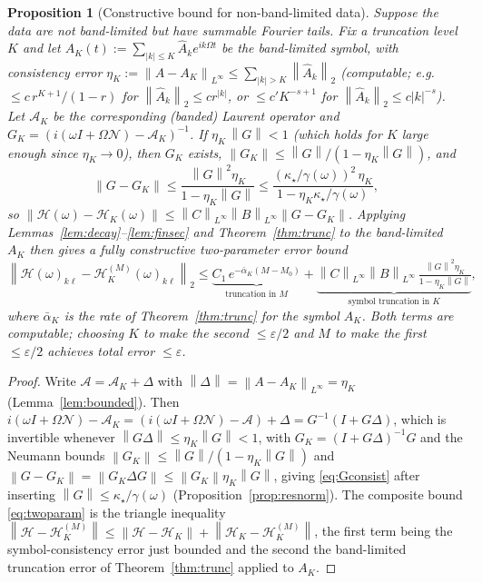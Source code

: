 \documentclass{amsart}
\newtheorem{proposition}{Proposition}
\theoremstyle{definition}
\newcommand{\norm}[1]{\left\lVert#1\right\rVert}
\newcommand{\Acal}{\mathcal{A}}
\newcommand{\Hcal}{\mathcal{H}}
\newcommand{\Ncal}{\mathcal{N}}
\begin{document}
\begin{proposition}[Constructive bound for non-band-limited data]\label{prop:general}
Suppose the data are not band-limited but have summable Fourier tails. Fix a
truncation level $K$ and let $A_K(t):=\sum_{|k|\le K}\hat A_k e^{ik\Omega t}$ be
the band-limited symbol, with consistency error
$\eta_K:=\norm{A-A_K}_{L^\infty}\le\sum_{|k|>K}\norm{\hat A_k}_2$
(computable; e.g. $\le c\,r^{K+1}/(1-r)$ for $\norm{\hat A_k}_2\le c r^{|k|}$, or
$\le c'K^{-s+1}$ for $\norm{\hat A_k}_2\le c|k|^{-s}$). Let $\Acal_K$ be the
corresponding (banded) Laurent operator and $G_K=(i(\omega I+\Omega\Ncal)-\Acal_K)^{-1}$.
If $\eta_K\,\norm{G}<1$ (which holds for $K$ large enough since
$\eta_K\to0$), then $G_K$ exists, $\norm{G_K}\le\norm{G}/(1-\eta_K\norm{G})$,
and
\begin{equation}\label{eq:Gconsist}
\norm{G-G_K}\le \frac{\norm{G}^2\eta_K}{1-\eta_K\norm{G}}
\le \frac{(\kappa_\star/\gamma(\omega))^2\,\eta_K}{1-\eta_K\kappa_\star/\gamma(\omega)},
\end{equation}
so $\norm{\Hcal(\omega)-\Hcal_K(\omega)}\le\norm{C}_{L^\infty}\norm{B}_{L^\infty}
\norm{G-G_K}$. Applying Lemmas~\ref{lem:decay}--\ref{lem:finsec} and
Theorem~\ref{thm:trunc} to the band-limited $A_K$ then gives a fully
\emph{constructive} two-parameter error bound
\begin{equation}\label{eq:twoparam}
\norm{\Hcal(\omega)_{k\ell}-\Hcal_K^{(M)}(\omega)_{k\ell}}_2
\le \underbrace{C_1\,e^{-\bar\alpha_K(M-M_0)}}_{\text{truncation in }M}
+\underbrace{\norm{C}_{L^\infty}\norm{B}_{L^\infty}\,\tfrac{\norm{G}^2\eta_K}{1-\eta_K\norm{G}}}_{\text{symbol truncation in }K},
\end{equation}
where $\bar\alpha_K$ is the rate of Theorem~\ref{thm:trunc} for the symbol $A_K$.
Both terms are computable; choosing $K$ to make the second $\le\varepsilon/2$ and
$M$ to make the first $\le\varepsilon/2$ achieves total error $\le\varepsilon$.
\end{proposition}

\begin{proof}
Write $\Acal=\Acal_K+\Delta$ with $\norm\Delta=\norm{A-A_K}_{L^\infty}=\eta_K$
(Lemma~\ref{lem:bounded}). Then
$i(\omega I+\Omega\Ncal)-\Acal_K=(i(\omega I+\Omega\Ncal)-\Acal)+\Delta
=G^{-1}(I+G\Delta)$, which is invertible whenever $\norm{G\Delta}\le\eta_K\norm G<1$,
with $G_K=(I+G\Delta)^{-1}G$ and the Neumann bounds
$\norm{G_K}\le\norm G/(1-\eta_K\norm G)$ and
$\norm{G-G_K}=\norm{G_K\Delta G}\le\norm{G_K}\eta_K\norm G$, giving
\eqref{eq:Gconsist} after inserting $\norm G\le\kappa_\star/\gamma(\omega)$
(Proposition~\ref{prop:resnorm}). The composite bound \eqref{eq:twoparam} is the
triangle inequality
$\norm{\Hcal-\Hcal_K^{(M)}}\le\norm{\Hcal-\Hcal_K}+\norm{\Hcal_K-\Hcal_K^{(M)}}$,
the first term being the symbol-consistency error just bounded and the second the
band-limited truncation error of Theorem~\ref{thm:trunc} applied to $A_K$.
\end{proof}
\end{document}

